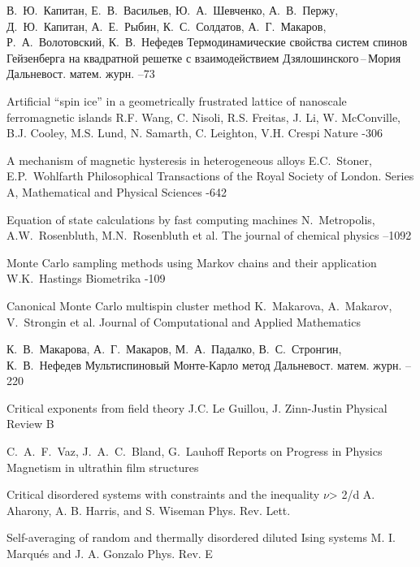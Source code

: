 \documentclass[10pt]{article}
\begin{document}
\begin{thebibliography}{20}
\by В.~Ю.~Капитан, Е.~В.~Васильев, Ю.~А.~Шевченко, А.~В.~Пержу, Д.~Ю.~Капитан, А.~Е.~Рыбин, К.~С.~Солдатов, А.~Г.~Макаров, Р.~А.~Волотовский, К.~В.~Нефедев
\paper Термодинамические свойства систем спинов Гейзенберга на квадратной решетке с взаимодействием Дзялошинского\,--\,Мория
\jour Дальневост. матем. журн.
--73

\paper Artificial ``spin ice'' in a geometrically frustrated lattice of nanoscale ferromagnetic islands
\by R.F. Wang, C. Nisoli, R.S. Freitas, J. Li, W. McConville, B.J. Cooley, M.S. Lund, N. Samarth, C. Leighton, V.H. Crespi
\jour Nature
-306

\paper A mechanism of magnetic hysteresis in heterogeneous alloys
\by E.C.~Stoner, E.P.~Wohlfarth
\jour Philosophical Transactions of the Royal Society of London. Series A, Mathematical and Physical Sciences
-642

\paper Equation of state calculations by fast computing machines
\by N.~Metropolis, A.W.~Rosenbluth, M.N.~Rosenbluth et al.
\jour The journal of chemical physics
--1092

\paper Monte Carlo sampling methods using Markov chains and their application
\by W.K.~Hastings
\jour Biometrika
-109

\paper Canonical Monte Carlo multispin cluster method
\by K.~Makarova, A.~Makarov, V.~Strongin et al.
\jour Journal of Computational and Applied Mathematics

\by К.~В.~Макарова, А.~Г.~Макаров, М.~А.~Падалко, В.~С.~Стронгин, К.~В.~Нефедев
\paper Мультиспиновый Монте-Карло метод
\jour Дальневост. матем. журн.
--220

\paper Critical exponents from field theory
\by J.C. Le Guillou, J. Zinn-Justin
\jour Physical Review B

\by C.~A.~F.~Vaz, J.~A.~C.~Bland, G.~Lauhoff
\jour Reports on Progress in Physics
\paper Magnetism in ultrathin film structures

\paper Critical disordered systems with constraints and the inequality $\nu$> 2/d
\by A. Aharony, A. B. Harris, and S. Wiseman
\jour Phys. Rev. Lett.

\paper Self-averaging of random and thermally disordered diluted Ising systems
\by M. I. Marqués and J. A. Gonzalo
\jour Phys. Rev. E

\end{thebibliography}



\EndArticle
\end{document}
